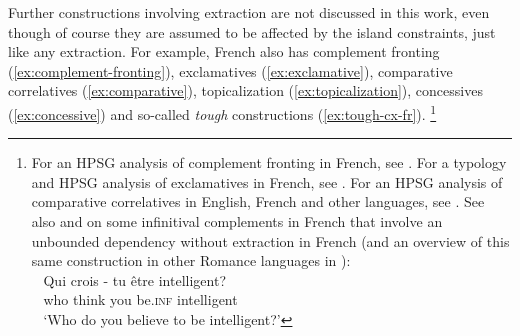 Further constructions involving extraction are not discussed in this work, even though of course they are assumed to be affected by the island constraints, just like any extraction. For example, French also has complement fronting (\ref{ex:complement-fronting}), exclamatives (\ref{ex:exclamative}), comparative correlatives (\ref{ex:comparative}), topicalization (\ref{ex:topicalization}), concessives (\ref{ex:concessive}) and so-called \emph{tough} constructions (\ref{ex:tough-cx-fr}).%
\footnote{For an HPSG analysis of complement fronting in French, see \citet{Abeille.2008.NP-preposing}. For a typology and HPSG analysis of exclamatives in French, see \citet{Marandin.2008}. For an HPSG analysis of comparative correlatives in English, French and other languages, see \citet{Abeille.2008.Comparative-correlatives}. See also \citet[40--42]{Godard.1988} and \citet[106--107]{Cinque.1990} on some infinitival complements in French that involve an unbounded dependency without extraction in French (and an overview of this same construction in other Romance languages in \citealt{Mensching.2000}):
\ea
    \citep[76]{Mensching.2000}\\ \nopagebreak
    \gll ~ Qui crois - tu être intelligent?\\
         ~  who think {} you be\textsc{.inf} intelligent\\
    \glt ~ `Who do you believe to be intelligent?'
\z}


